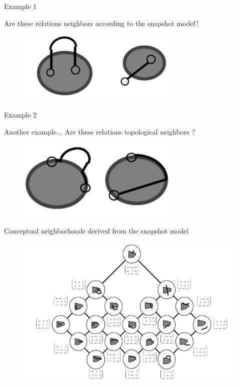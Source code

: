 \begin{frame}{Example 1}
\begin{block}{Are these relations neighbors according to the snapshot model?}
\begin{figure}
\begin{center}
\includegraphics[width = 0.7\textwidth]{images/example1snap.png}
\end{center}
\end{figure}
\end{block}
\end{frame}

\begin{frame}{Example 2}
\begin{block}{Another example... Are these relations topological neighbors ?}
\begin{figure}
\begin{center}
\includegraphics[width = 0.7\textwidth]{images/example2snap.png}
\end{center}
\end{figure}
\end{block}
\end{frame}

\begin{frame}{Conceptual neighborhoods derived from the snapshot model}
\begin{figure}
\begin{center}
\includegraphics[width = \textwidth]{images/snapfull.png}
\end{center}
\end{figure}
\end{frame}